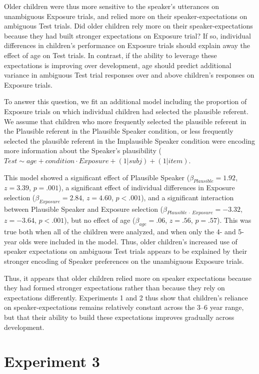 \documentclass[man,floatsintext]{apa6}
\begin{document}
Older children were thus more sensitive to the speaker's utterances on unambiguous Exposure trials, and relied more on their speaker-expectations on ambiguous Test trials. Did older children rely more on their speaker-expectations because they had built stronger expectations on Exposure trial? If so, individual differences in children's performance on Exposure trials should explain away the effect of age on Test trials. In contrast, if the ability to leverage these expectations is improving over development, age should predict additional variance in ambiguous Test trial responses over and above children's responses on Exposure trials.

To answer this question, we fit an additional model including the proportion of Exposure trials on which individual children had selected the plausible referent. We assume that children who more frequently selected the plausible referent in the Plausible referent in the Plausible Speaker condition, or less frequently selected the plausible referent in the Implausible Speaker condition were encoding more information about the Speaker's plausibility ($Test \sim age + condition \cdot Exposure + (1|subj) + (1|item)$.

This model showed a significant effect of Plausible Speaker ($\beta_{Plausible} = 1.92$, $z = 3.39$, $p = .001$), a significant effect of individual differences in Exposure selection ($\beta_{Exposure} = 2.84$, $z = 4.60$, $p < .001$), and a significant interaction between Plausible Speaker and Exposure selection ($\beta_{Plausible \: \cdot \: Exposure} = -3.32$, $z = -3.64$, $p < .001$), but no effect of age ($\beta_{age} = .06$, $z = .56$, $p = .57$). This was true both when all of the children were analyzed, and when only the 4- and 5- year olds were included in the model. Thus, older children's increased use of speaker expectations on ambiguous Test trials appears to be explained by their stronger encoding of Speaker preferences on the unambiguous Exposure trials.

Thus, it appears that older children relied more on speaker expectations because they had formed stronger expectations rather than because they rely on expectations differently. Experiments 1 and 2 thus show that children's reliance on speaker-expectations remains relatively constant across the 3--6 year range, but that their ability to build these expectations improves gradually across development.


\section{Experiment 3}
\end{document}
